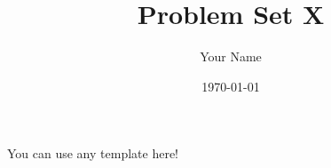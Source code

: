 \documentclass{article}
\title{Problem Set X}
\author{Your Name}
\date{\today}
\begin{document}
\maketitle

You can use any template here!
\end{document}
